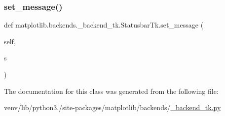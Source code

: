 \subsubsection{\texorpdfstring{set\+\_\+message()}{set\_message()}}
{\footnotesize\ttfamily def matplotlib.\+backends.\+\_\+backend\+\_\+tk.\+Statusbar\+Tk.\+set\+\_\+message (\begin{DoxyParamCaption}\item[{}]{self,  }\item[{}]{s }\end{DoxyParamCaption})}



The documentation for this class was generated from the following file\+:\begin{DoxyCompactItemize}
\item 
venv/lib/python3./site-\/packages/matplotlib/backends/\hyperlink{__backend__tk_8py}{\+\_\+backend\+\_\+tk.\+py}\end{DoxyCompactItemize}
